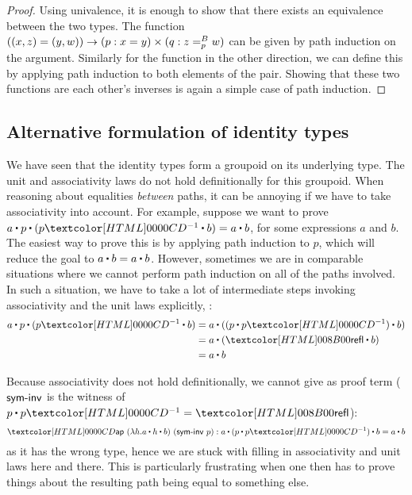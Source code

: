 \begin{proof}
  Using univalence, it is enough to show that there exists an
  equivalence between the two types. The function
  $((x , z) = (y , w)) \to (p : x = y) \times (q :
  \pathover{B}{p}{z}{w})$
  can be given by path induction on the argument. Similarly for the
  function in the other direction, we can define this by applying path
  induction to both elements of the pair. Showing that these two
  functions are each other's inverses is again a simple case of path
  induction.
\end{proof}

\subsection{Alternative formulation of identity types}
\label{alt-identity-type}
We have seen that the identity types form a groupoid on its underlying
type. The unit and associativity laws do not hold definitionally for
this groupoid. When reasoning about equalities \emph{between} paths,
it can be annoying if we have to take associativity into account. For
example, suppose we want to prove
$a \ct p \ct (\sym{p} \ct b) = a \ct b$, for some expressions $a$ and
$b$. The easiest way to prove this is by applying path induction to
$p$, which will reduce the goal to $a \ct b = a \ct b$. However,
sometimes we are in comparable situations where we cannot perform path
induction on all of the paths involved. In such a situation, we have
to take a lot of intermediate steps invoking associativity and the
unit laws explicitly, \eg:
%
\begin{align*}
  a \ct p \ct (\sym{p} \ct b) &= a \ct ((p \ct \sym{p}) \ct b) \\
                              &= a \ct (\refl \ct b) \\
                              &= a \ct b
\end{align*}

Because associativity does not hold definitionally, we cannot give as
proof term ($\ident{sym-inv}$ is the witness of
$\trans{p}{\sym{p}} = \refl$):
$$
\ap\ (\lambda h . a \ct h \ct b)\ (\ident{sym-inv}\ p) : a \ct (p \ct \sym{p}) \ct b = a \ct b
$$
as it has the wrong type, hence we are stuck with filling in
associativity and unit laws here and there. This is particularly
frustrating when one then has to prove things about the resulting path
being equal to something else.

